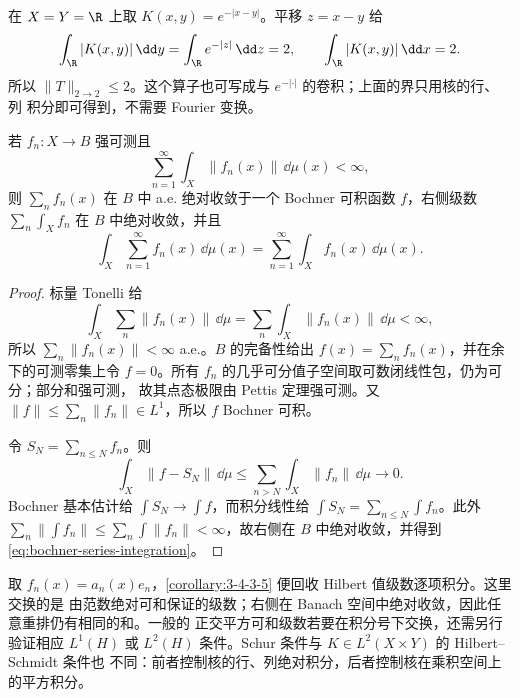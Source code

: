 \begin{remark}
在 $X=Y=\R$ 上取 $K(x,y)=e^{-|x-y|}$。平移 $z=x-y$ 给
\[
 \int_\R|K(x,y)|\,\dd y=\int_\R e^{-|z|}\,\dd z=2,
 \qquad
 \int_\R|K(x,y)|\,\dd x=2.
\]
所以 $\|T\|_{2\to2}\le2$。这个算子也可写成与 $e^{-|\cdot|}$ 的卷积；上面的界只用核的行、列
积分即可得到，不需要 Fourier 变换。
\end{remark}

\begin{corollary}[绝对可和的向量级数可逐项积分]\label{corollary:3-4-3-5}
若 $f_n:X\to B$ 强可测且
\[
 \sum_{n=1}^{\infty}\int_X\|f_n(x)\|\,\dd\mu(x)<\infty,
\]
则 $\sum_nf_n(x)$ 在 $B$ 中 a.e. 绝对收敛于一个 Bochner 可积函数 $f$，右侧级数
$\sum_n\int_Xf_n$ 在 $B$ 中绝对收敛，并且
\[
 \int_X\sum_{n=1}^{\infty}f_n(x)\,\dd\mu(x)
 =\sum_{n=1}^{\infty}\int_Xf_n(x)\,\dd\mu(x).
 \tag{3.4.27}\label{eq:bochner-series-integration}
\]
\end{corollary}

\begin{proof}
标量 Tonelli 给
\[
 \int_X\sum_n\|f_n(x)\|\,\dd\mu
 =\sum_n\int_X\|f_n(x)\|\,\dd\mu<\infty,
\]
所以 $\sum_n\|f_n(x)\|<\infty$ a.e.。$B$ 的完备性给出
$f(x)=\sum_nf_n(x)$，并在余下的可测零集上令 $f=0$。所有 $f_n$ 的几乎可分值子空间取可数闭线性包，仍为可分；部分和强可测，
故其点态极限由 Pettis 定理强可测。又
$\|f\|\le\sum_n\|f_n\|\in L^1$，所以 $f$ Bochner 可积。

令 $S_N=\sum_{n\le N}f_n$。则
\[
 \int_X\|f-S_N\|\,\dd\mu
 \le\sum_{n>N}\int_X\|f_n\|\,\dd\mu\longrightarrow0.
\]
Bochner 基本估计给 $\int S_N\to\int f$，而积分线性给
$\int S_N=\sum_{n\le N}\int f_n$。此外
$\sum_n\|\int f_n\|\le\sum_n\int\|f_n\|<\infty$，故右侧在 $B$ 中绝对收敛，并得到
\eqref{eq:bochner-series-integration}。
\end{proof}

取 $f_n(x)=a_n(x)e_n$，\cref{corollary:3-4-3-5} 便回收 Hilbert 值级数逐项积分。这里交换的是
由范数绝对可和保证的级数；右侧在 Banach 空间中绝对收敛，因此任意重排仍有相同的和。一般的
正交平方可和级数若要在积分号下交换，还需另行验证相应
$L^1(H)$ 或 $L^2(H)$ 条件。Schur 条件与 $K\in L^2(X\times Y)$ 的 Hilbert--Schmidt 条件也
不同：前者控制核的行、列绝对积分，后者控制核在乘积空间上的平方积分。

